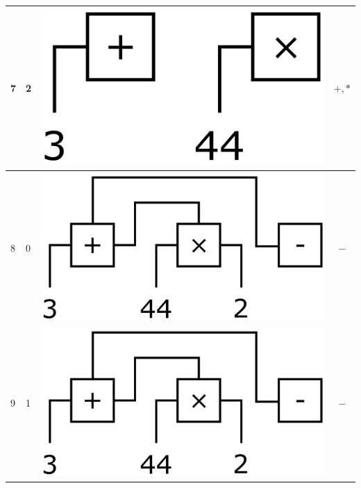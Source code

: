 \documentclass[12pt, a4paper]{report}
\begin{document}
\begin{center}
\begin{tabular}{ |l|l|c|c| }
	7 & 2 & \includegraphics[trim=0 -3 0 -3,height=0.06\textheight]{assets/expr1.jpg} & $+, *$ \\ 
	\hline
	8 & 0 & \includegraphics[trim=0 -3 0 -3,height=0.09\textheight]{assets/expr2.jpg} & $-$ \\
	\hline
	9 & 1 & \includegraphics[trim=0 -2 0 -3,height=0.09\textheight]{assets/expr2.jpg} & $-$ \\ 
	\hline

\end{tabular}
\end{center}
\end{document}
